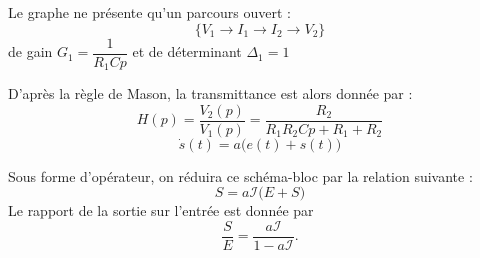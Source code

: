 Le graphe ne présente qu'un parcours ouvert :
\[
    \{V_1\rightarrow I_1\rightarrow I_2\rightarrow V_2\}
\]
de gain $G_1=\dfrac{1}{R_1Cp}$ et de déterminant $\Delta_1=1$

D'après la règle de Mason, la transmittance est alors donnée par :
\[
    H(p)=\dfrac{V_2(p)}{V_1(p)}=\dfrac{R_2}{R_1R_2Cp+ R_1+R_2}
\]
\clearpage
\[
    \dot{s}(t)=a\big(e(t)+s(t)\big)
\]
\begin{center}
    
\end{center}
Sous forme d'opérateur, on réduira ce schéma-bloc par 
la relation suivante :
\[
    S=a\mathcal{I}\big(E+S\big)
\]
Le rapport de la sortie sur l'entrée est donnée par
\[
    \dfrac{S}{E}=\dfrac{a\mathcal{I}}{1-a\mathcal{I}}.
\]
